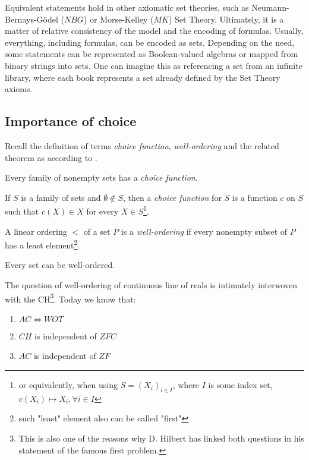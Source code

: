Equivalent statements hold in other axiomatic set theories, such as Neumann-Bernays-Gödel ($NBG$) or Morse-Kelley ($MK$) Set Theory. Ultimately, it is a matter of relative consistency of the model and the encoding of formulas. Usually, everything, including formulas, can be encoded as sets. Depending on the need, some statements can be represented as Boolean-valued algebras or mapped from binary strings into sets. One can imagine this as referencing a set from an infinite library, where each book represents a set already defined by the Set Theory axioms.


\subsection{Importance of choice}\label{subsect_importance_of_choice}

Recall the definition of terms \textit{choice function}, \textit{well-ordering} and the related theorem as according to \cite{jech2003set}.

\begin{axiom}
  Every family of nonempty sets has a \textit{choice function}.
\end{axiom}

If $S$ is a family of sets and $\emptyset \notin S$, then a \textit{choice function} for $S$ is a function
$c$ on $S$ such that $c(X) \in X$ for every $X \in S$\footnote{or equivalently, when using $S =(X_i)_{i \in I}$, where $I$ is some index set, $c(X_i) \mapsto X_i, \forall i \in I$}.

\begin{definition}
  A linear ordering $<$ of a set $P$ is a \textit{well-ordering} if every nonempty subset of $P$ has a least element\footnote{such "least" element also can be called "first"}.
\end{definition}

\begin{theorem}
  Every set can be well-ordered.
\end{theorem}

The question of well-ordering of continuous line of reals is intimately interwoven with the CH\footnote{This is also one of the reasons why D. Hilbert has linked both questions in his statement of the famous first problem\cite{herrlich2006ac}.}. Today we know that:
\begin{enumerate}
  \item $AC \Longleftrightarrow WOT$
  \item $CH$ is independent of $ZFC$
  \item $AC$ is independent of $ZF$
\end{enumerate}

